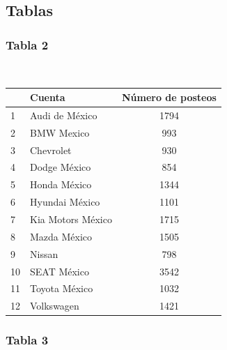 \documentclass[a4paper,10pt]{article}
\begin{document}
\subsection{Tablas}

\subsubsection{Tabla 2}

\begin{center}
  \\[0.3cm]
  \begin{tabular}{l|l|c}
    \hline 
    & Cuenta & Número de posteos \\
    \hline
    1 & Audi de México & 1794 \\
    2 & BMW Mexico & 993 \\
    3 & Chevrolet & 930 \\
    4 & Dodge México & 854 \\
    5 & Honda México & 1344 \\
    6 & Hyundai México & 1101 \\
    7 & Kia Motors México & 1715 \\
    8 & Mazda México & 1505 \\
    9 & Nissan & 798 \\
    10 & SEAT México & 3542 \\
    11 & Toyota México & 1032 \\
    12 & Volkswagen & 1421 \\
    \hline
  \end{tabular}
\end{center}

\subsubsection{Tabla 3}
\end{document}
